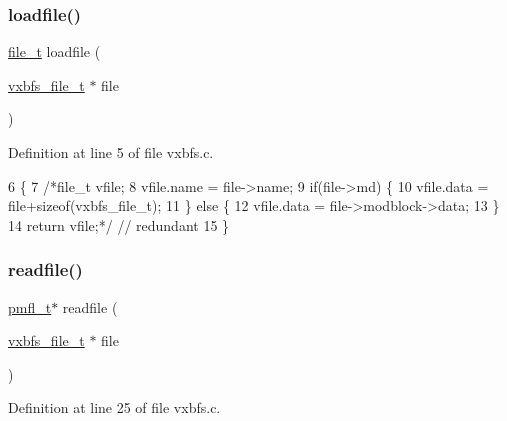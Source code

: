 \subsubsection{\texorpdfstring{loadfile()}{loadfile()}}
{\footnotesize\ttfamily \hyperlink{a00191_aa5445a6474a23ee3e7756d432dfa4ba1_aa5445a6474a23ee3e7756d432dfa4ba1}{file\+\_\+t} loadfile (\begin{DoxyParamCaption}\item[{\hyperlink{a00206_abb93e2407af0d8fe0f5629ce6456c6f9_abb93e2407af0d8fe0f5629ce6456c6f9}{vxbfs\+\_\+file\+\_\+t} $\ast$}]{file }\end{DoxyParamCaption})}



Definition at line 5 of file vxbfs.\+c.


\begin{DoxyCode}
6 \{
7     \textcolor{comment}{/*file\_t vfile;}
8 \textcolor{comment}{    vfile.name = file->name;}
9 \textcolor{comment}{    if(file->md) \{}
10 \textcolor{comment}{        vfile.data = file+sizeof(vxbfs\_file\_t);}
11 \textcolor{comment}{    \} else \{}
12 \textcolor{comment}{        vfile.data = file->modblock->data;}
13 \textcolor{comment}{    \}}
14 \textcolor{comment}{    return vfile;*/} \textcolor{comment}{// redundant}
15 \}
\end{DoxyCode}
\mbox{\label{a00203_a092e5bdd19e8369aa33901fffeb1f025_a092e5bdd19e8369aa33901fffeb1f025}} 
\subsubsection{\texorpdfstring{readfile()}{readfile()}}
{\footnotesize\ttfamily \hyperlink{a00191_a02f7eedc7de6c770b6b29a62905fc61d_a02f7eedc7de6c770b6b29a62905fc61d}{pmfl\+\_\+t}$\ast$ readfile (\begin{DoxyParamCaption}\item[{\hyperlink{a00206_abb93e2407af0d8fe0f5629ce6456c6f9_abb93e2407af0d8fe0f5629ce6456c6f9}{vxbfs\+\_\+file\+\_\+t} $\ast$}]{file }\end{DoxyParamCaption})}



Definition at line 25 of file vxbfs.\+c.


